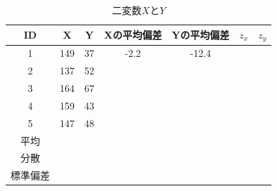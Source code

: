 \begin{table}[ht]
	\centering
	\caption{二変数$X$と$Y$}
	\begin{tabular}{ccccccc}
		\hline
		ID   & X   & Y  & Xの平均偏差 & Yの平均偏差 & $z_x$ & $z_y$ \\
		\hline
		1    & 149 & 37 & -2.2   & -12.4  &       &       \\
		2    & 137 & 52 &        &        &       &       \\
		3    & 164 & 67 &        &        &       &       \\
		4    & 159 & 43 &        &        &       &       \\
		5    & 147 & 48 &        &        &       &       \\
		\hline
		平均   &     &    &        &        &       &       \\
		分散   &     &    &        &        &       &       \\
		標準偏差 &     &    &        &        &       &       \\\hline
	\end{tabular}
	\label{tbl::04_05}
\end{table}
